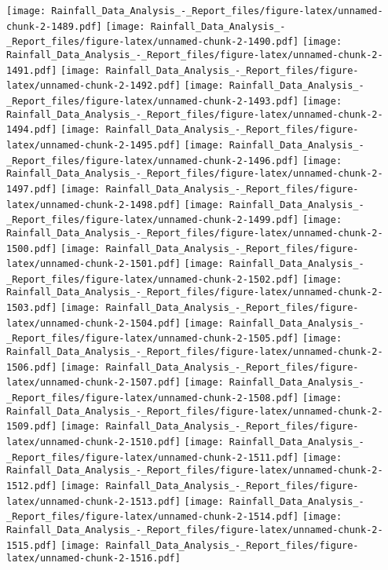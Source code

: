 \documentclass[
]{article}
\begin{document}
\texttt{[image: Rainfall\_Data\_Analysis\_-\_Report\_files/figure-latex/unnamed-chunk-2-1489.pdf]}
\texttt{[image: Rainfall\_Data\_Analysis\_-\_Report\_files/figure-latex/unnamed-chunk-2-1490.pdf]}
\texttt{[image: Rainfall\_Data\_Analysis\_-\_Report\_files/figure-latex/unnamed-chunk-2-1491.pdf]}
\texttt{[image: Rainfall\_Data\_Analysis\_-\_Report\_files/figure-latex/unnamed-chunk-2-1492.pdf]}
\texttt{[image: Rainfall\_Data\_Analysis\_-\_Report\_files/figure-latex/unnamed-chunk-2-1493.pdf]}
\texttt{[image: Rainfall\_Data\_Analysis\_-\_Report\_files/figure-latex/unnamed-chunk-2-1494.pdf]}
\texttt{[image: Rainfall\_Data\_Analysis\_-\_Report\_files/figure-latex/unnamed-chunk-2-1495.pdf]}
\texttt{[image: Rainfall\_Data\_Analysis\_-\_Report\_files/figure-latex/unnamed-chunk-2-1496.pdf]}
\texttt{[image: Rainfall\_Data\_Analysis\_-\_Report\_files/figure-latex/unnamed-chunk-2-1497.pdf]}
\texttt{[image: Rainfall\_Data\_Analysis\_-\_Report\_files/figure-latex/unnamed-chunk-2-1498.pdf]}
\texttt{[image: Rainfall\_Data\_Analysis\_-\_Report\_files/figure-latex/unnamed-chunk-2-1499.pdf]}
\texttt{[image: Rainfall\_Data\_Analysis\_-\_Report\_files/figure-latex/unnamed-chunk-2-1500.pdf]}
\texttt{[image: Rainfall\_Data\_Analysis\_-\_Report\_files/figure-latex/unnamed-chunk-2-1501.pdf]}
\texttt{[image: Rainfall\_Data\_Analysis\_-\_Report\_files/figure-latex/unnamed-chunk-2-1502.pdf]}
\texttt{[image: Rainfall\_Data\_Analysis\_-\_Report\_files/figure-latex/unnamed-chunk-2-1503.pdf]}
\texttt{[image: Rainfall\_Data\_Analysis\_-\_Report\_files/figure-latex/unnamed-chunk-2-1504.pdf]}
\texttt{[image: Rainfall\_Data\_Analysis\_-\_Report\_files/figure-latex/unnamed-chunk-2-1505.pdf]}
\texttt{[image: Rainfall\_Data\_Analysis\_-\_Report\_files/figure-latex/unnamed-chunk-2-1506.pdf]}
\texttt{[image: Rainfall\_Data\_Analysis\_-\_Report\_files/figure-latex/unnamed-chunk-2-1507.pdf]}
\texttt{[image: Rainfall\_Data\_Analysis\_-\_Report\_files/figure-latex/unnamed-chunk-2-1508.pdf]}
\texttt{[image: Rainfall\_Data\_Analysis\_-\_Report\_files/figure-latex/unnamed-chunk-2-1509.pdf]}
\texttt{[image: Rainfall\_Data\_Analysis\_-\_Report\_files/figure-latex/unnamed-chunk-2-1510.pdf]}
\texttt{[image: Rainfall\_Data\_Analysis\_-\_Report\_files/figure-latex/unnamed-chunk-2-1511.pdf]}
\texttt{[image: Rainfall\_Data\_Analysis\_-\_Report\_files/figure-latex/unnamed-chunk-2-1512.pdf]}
\texttt{[image: Rainfall\_Data\_Analysis\_-\_Report\_files/figure-latex/unnamed-chunk-2-1513.pdf]}
\texttt{[image: Rainfall\_Data\_Analysis\_-\_Report\_files/figure-latex/unnamed-chunk-2-1514.pdf]}
\texttt{[image: Rainfall\_Data\_Analysis\_-\_Report\_files/figure-latex/unnamed-chunk-2-1515.pdf]}
\texttt{[image: Rainfall\_Data\_Analysis\_-\_Report\_files/figure-latex/unnamed-chunk-2-1516.pdf]}
\end{document}
